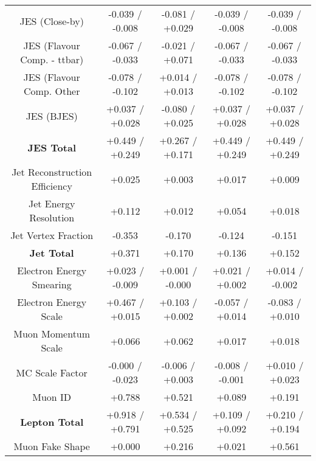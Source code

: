 \begin{table}[htbp]
\begin{center}
\begin{tabular}{|c|c|c|c|c|}
JES (Close-by)                        &-0.039   / -0.008   & -0.081   / +0.029   & -0.039   / -0.008   & -0.039   / -0.008  \\
JES (Flavour Comp. - ttbar)           &-0.067   / -0.033   & -0.021   / +0.071   & -0.067   / -0.033   & -0.067   / -0.033  \\
JES (Flavour Comp. Other              &-0.078   / -0.102   & +0.014   / +0.013   & -0.078   / -0.102   & -0.078   / -0.102  \\
JES (BJES)                            &+0.037   / +0.028   & -0.080   / +0.025   & +0.037   / +0.028   & +0.037   / +0.028  \\
\hline
\textbf{JES Total}                    &+0.449   / +0.249   & +0.267   / +0.171   & +0.449   / +0.249   & +0.449   / +0.249  \\
\hline
Jet Reconstruction Efficiency         &+0.025              & +0.003              & +0.017              & +0.009             \\
Jet Energy Resolution                 &+0.112              & +0.012              & +0.054              & +0.018             \\
Jet Vertex Fraction                   &-0.353              & -0.170              & -0.124              & -0.151             \\
\hline
\textbf{Jet Total}                    &+0.371              & +0.170              & +0.136              & +0.152             \\
\hline
Electron Energy Smearing              &+0.023   / -0.009   & +0.001   / -0.000   & +0.021   / +0.002   & +0.014   / -0.002  \\
Electron Energy Scale                 &+0.467   / +0.015   & +0.103   / +0.002   & -0.057   / +0.014   & -0.083   / +0.010  \\
Muon Momentum Scale                   &+0.066              & +0.062              & +0.017              & +0.018             \\
MC Scale Factor                       &-0.000   / -0.023   & -0.006   / +0.003   & -0.008   / -0.001   & +0.010   / +0.023  \\
Muon ID                               &+0.788              & +0.521              & +0.089              & +0.191             \\
\hline
\textbf{Lepton Total}                 &+0.918   / +0.791   & +0.534   / +0.525   & +0.109   / +0.092   & +0.210   / +0.194  \\
\hline
Muon Fake Shape                       &+0.000              & +0.216              & +0.021              & +0.561             \\

\end{tabular}
\end{center}
\end{table}
